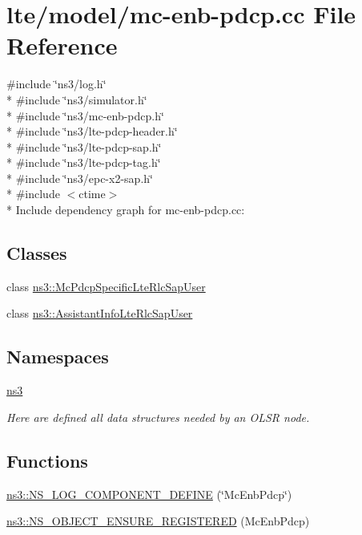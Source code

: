 \hypertarget{mc-enb-pdcp_8cc}{}\section{lte/model/mc-\/enb-\/pdcp.cc File Reference}
\label{mc-enb-pdcp_8cc}
{\ttfamily \#include \char`\"{}ns3/log.\+h\char`\"{}}\\*
{\ttfamily \#include \char`\"{}ns3/simulator.\+h\char`\"{}}\\*
{\ttfamily \#include \char`\"{}ns3/mc-\/enb-\/pdcp.\+h\char`\"{}}\\*
{\ttfamily \#include \char`\"{}ns3/lte-\/pdcp-\/header.\+h\char`\"{}}\\*
{\ttfamily \#include \char`\"{}ns3/lte-\/pdcp-\/sap.\+h\char`\"{}}\\*
{\ttfamily \#include \char`\"{}ns3/lte-\/pdcp-\/tag.\+h\char`\"{}}\\*
{\ttfamily \#include \char`\"{}ns3/epc-\/x2-\/sap.\+h\char`\"{}}\\*
{\ttfamily \#include $<$ctime$>$}\\*
Include dependency graph for mc-\/enb-\/pdcp.cc\+:
\subsection*{Classes}
\begin{DoxyCompactItemize}
\item 
class \hyperlink{classns3_1_1McPdcpSpecificLteRlcSapUser}{ns3\+::\+Mc\+Pdcp\+Specific\+Lte\+Rlc\+Sap\+User}
\item 
class \hyperlink{classns3_1_1AssistantInfoLteRlcSapUser}{ns3\+::\+Assistant\+Info\+Lte\+Rlc\+Sap\+User}
\end{DoxyCompactItemize}
\subsection*{Namespaces}
\begin{DoxyCompactItemize}
\item 
 \hyperlink{namespacens3}{ns3}
\begin{DoxyCompactList}\small\item\em Here are defined all data structures needed by an O\+L\+SR node. \end{DoxyCompactList}\end{DoxyCompactItemize}
\subsection*{Functions}
\begin{DoxyCompactItemize}
\item 
\hyperlink{namespacens3_aadc6ec04abe6b7f15c2d752f116490a2}{ns3\+::\+N\+S\+\_\+\+L\+O\+G\+\_\+\+C\+O\+M\+P\+O\+N\+E\+N\+T\+\_\+\+D\+E\+F\+I\+NE} (\char`\"{}Mc\+Enb\+Pdcp\char`\"{})
\item 
\hyperlink{namespacens3_a7177ac46f83a00bac6c648d968f55f1a}{ns3\+::\+N\+S\+\_\+\+O\+B\+J\+E\+C\+T\+\_\+\+E\+N\+S\+U\+R\+E\+\_\+\+R\+E\+G\+I\+S\+T\+E\+R\+ED} (Mc\+Enb\+Pdcp)
\end{DoxyCompactItemize}
